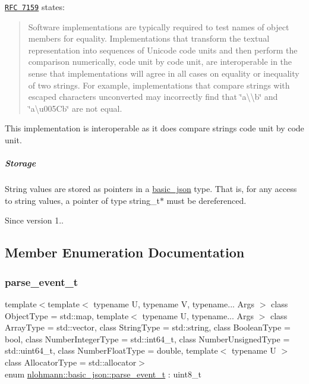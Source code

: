 \href{http://rfc7159.net/rfc7159}{\tt R\+FC 7159} states\+: \begin{quote}
Software implementations are typically required to test names of object members for equality. Implementations that transform the textual representation into sequences of Unicode code units and then perform the comparison numerically, code unit by code unit, are interoperable in the sense that implementations will agree in all cases on equality or inequality of two strings. For example, implementations that compare strings with escaped characters unconverted may incorrectly find that {\ttfamily \char`\"{}a\textbackslash{}\textbackslash{}b\char`\"{}} and {\ttfamily \char`\"{}a\textbackslash{}u005\+Cb\char`\"{}} are not equal. \end{quote}


This implementation is interoperable as it does compare strings code unit by code unit.

\subparagraph*{Storage}

String values are stored as pointers in a \hyperlink{classnlohmann_1_1basic__json}{basic\+\_\+json} type. That is, for any access to string values, a pointer of type {\ttfamily string\+\_\+t$\ast$} must be dereferenced.

\begin{DoxySince}{Since}
version 1.. 
\end{DoxySince}


\subsection{Member Enumeration Documentation}
\hypertarget{classnlohmann_1_1basic__json_aea1c863b719b4ca5b77188c171bbfafe}{}\label{classnlohmann_1_1basic__json_aea1c863b719b4ca5b77188c171bbfafe} 
\subsubsection{\texorpdfstring{parse\+\_\+event\+\_\+t}{parse\_event\_t}}
{\footnotesize\ttfamily template$<$template$<$ typename U, typename V, typename... Args $>$ class Object\+Type = std\+::map, template$<$ typename U, typename... Args $>$ class Array\+Type = std\+::vector, class String\+Type  = std\+::string, class Boolean\+Type  = bool, class Number\+Integer\+Type  = std\+::int64\+\_\+t, class Number\+Unsigned\+Type  = std\+::uint64\+\_\+t, class Number\+Float\+Type  = double, template$<$ typename U $>$ class Allocator\+Type = std\+::allocator$>$ \\
enum \hyperlink{classnlohmann_1_1basic__json_aea1c863b719b4ca5b77188c171bbfafe}{nlohmann\+::basic\+\_\+json\+::parse\+\_\+event\+\_\+t} \+: uint8\+\_\+t\hspace{0.3cm}{\ttfamily [strong]}}



